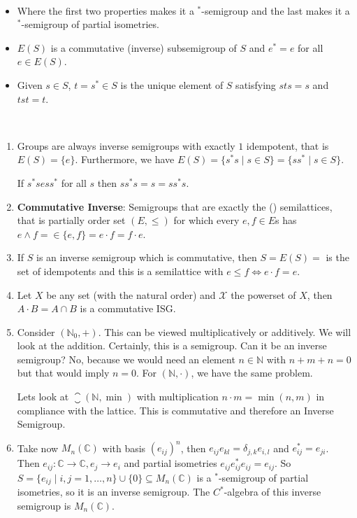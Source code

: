 \documentclass[a4paper]{article}
\begin{document}
\begin{remark}~
	\begin{itemize}
		\item 
		Where the first two properties makes it a $^*$-semigroup and the last makes it a $^*$-semigroup of partial isometries.
		\item $E(S)$ is a commutative (inverse) subsemigroup of $S$ and $e^*=e$ for all $e \in E(S)$.
		\item Given $s \in S$, $t = s^* \in S$ is the unique element of $S$ satisfying $sts = s$ and $tst = t$.
	\end{itemize}
\end{remark}

\begin{example}~
	\begin{enumerate}
		\item Groups are always inverse semigroups with exactly $1$ idempotent, that is $E(S) = \{e\}$.
		Furthermore, we have $E(S) = \{s^* s \mid s \in S\} = \{s s^* \mid s \in S \}$.

		If $s^*s e ss^* $ for all $s$ then $s s^* s = s = ss^*s$.
		\item \textbf{Commutative Inverse}:
		Semigroups that are exactly the () semilattices, that is partially order set $(E, \leq)$ for which every $e,f \in E$s has $e \wedge f = \in \{e, f\} = e \cdot f = f \cdot e$.

		\item If $S$ is an inverse semigroup which is commutative, then $S = E(S) = $ is the set of idempotents and this is a semilattice with $e \leq f \iff e \cdot f = e$.
		\item Let $X$ be any set (with the natural order) and $\mathcal{X} $ the powerset of $X$, then $A \cdot B = A \cap B$ is a commutative ISG.
		\item Consider $(\mathds{N}_0, +)$.
		This can be viewed multiplicatively or additively. 
		We will look at the addition.
		Certainly, this is a semigroup.
		Can it be an inverse semigroup?
		No, because we would need an element $n \in \mathds{N}$ with $n + m + n =0$ but that would imply $n = 0$.
		For $(\mathds{N}, \cdot)$, we have the same problem.

		Lets look at $\closure{(\mathds{N}, \min)}$ with multiplication $n \cdot m = \min (n,m)$ in compliance with the lattice.
		This is commutative and therefore an Inverse Semigroup.
		\item Take now $M_n(\mathds{C})$ with basis $(e_{ij})^n$, then $e_{ij} e_{kl} = \delta_{j,k} e_{i,l}$ and $e_{ij}^* = e_{ji}$.
		Then $e_{ij}: \mathds{C} \to \mathds{C}, e_j \to e_i$ and partial isometries $e_{ij} e_{ij}^* e_{ij} = e_{ij}$.
		So $S = \{ e_{ij} \mid i,j = 1, \dots, n \} \cup \{0\} \subseteq M_n(\mathds{C})$ is a $^*$-semigroup of partial isometries, so it is an inverse semigroup.
		The $C^*$-algebra of this inverse semigroup is $M_n(\mathds{C})$.


\end{enumerate}
\end{example}
\end{document}
